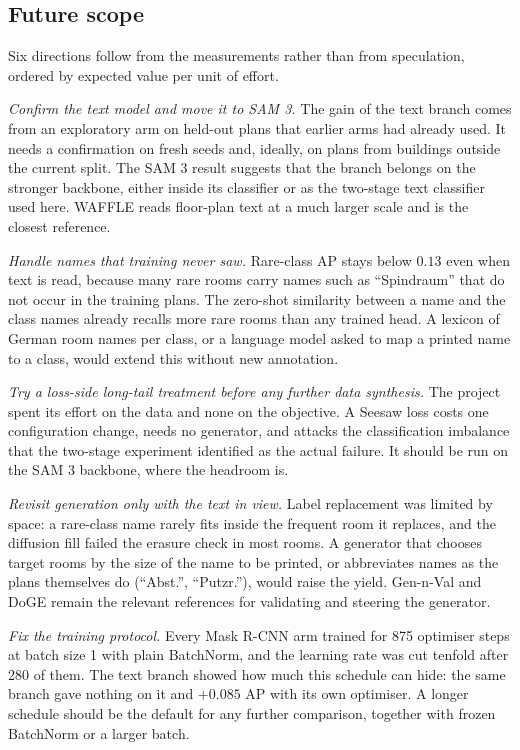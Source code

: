 \subsection*{Future scope}

Six directions follow from the measurements rather than from speculation,
ordered by expected value per unit of effort.

\emph{Confirm the text model and move it to SAM 3.} The gain of the text
branch comes from an exploratory arm on held-out plans that earlier arms had
already used. It needs a confirmation on fresh seeds and, ideally, on plans
from buildings outside the current split. The SAM 3 result suggests that the
branch belongs on the stronger backbone, either inside its classifier or as the
two-stage text classifier used here. WAFFLE \cite{ganon2025waffle} reads
floor-plan text at a much larger scale and is the closest reference.

\emph{Handle names that training never saw.} Rare-class AP stays below $0.13$
even when text is read, because many rare rooms carry names such as
``Spindraum'' that do not occur in the training plans. The zero-shot similarity
between a name and the class names already recalls more rare rooms than any
trained head. A lexicon of German room names per class, or a language model
asked to map a printed name to a class, would extend this without new
annotation.

\emph{Try a loss-side long-tail treatment before any further data synthesis.}
The project spent its effort on the data and none on the objective. A Seesaw
loss \cite{wang2021seesaw} costs one configuration change, needs no generator,
and attacks the classification imbalance that the two-stage experiment
identified as the actual failure. It should be run on the SAM 3 backbone, where
the headroom is.

\emph{Revisit generation only with the text in view.} Label replacement was
limited by space: a rare-class name rarely fits inside the frequent room it
replaces, and the diffusion fill failed the erasure check in most rooms. A
generator that chooses target rooms by the size of the name to be printed, or
abbreviates names as the plans themselves do (``Abst.'', ``Putzr.''), would
raise the yield. Gen-n-Val \cite{huang2025gennval} and DoGE \cite{wang2024doge}
remain the relevant references for validating and steering the generator.

\emph{Fix the training protocol.} Every Mask R-CNN arm trained for 875
optimiser steps at batch size 1 with plain BatchNorm, and the learning rate was
cut tenfold after 280 of them. The text branch showed how much this schedule can
hide: the same branch gave nothing on it and $+0.085$ AP with its own
optimiser. A longer schedule should be the default for any further comparison,
together with frozen BatchNorm or a larger batch.

